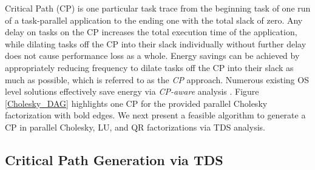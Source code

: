 \documentclass[12pt]{elsarticle}
\begin{document}
Critical Path (CP) is one particular task trace from the beginning task of one run of a task-parallel application to the ending one with the total slack of zero. Any delay on tasks on the CP increases the total execution time of the application, while dilating tasks off the CP into their slack individually without further delay does not cause performance loss as a whole. Energy savings can be achieved by appropriately reducing frequency to dilate tasks off the CP into their slack as much as possible, which is referred to as the \emph{CP} approach. Numerous existing OS level solutions effectively save energy via \emph{CP-aware} analysis \cite{ipdps05a} \cite{sc06} \cite{sc07} \cite{ics09} \cite{hpcs11} \cite{csrd12a}. Figure \ref{Cholesky_DAG} highlights one CP for the provided parallel Cholesky factorization with bold edges. We next present a feasible algorithm to generate a CP in parallel Cholesky, LU, and QR factorizations via TDS analysis.

\subsection{Critical Path Generation via TDS}
\end{document}
